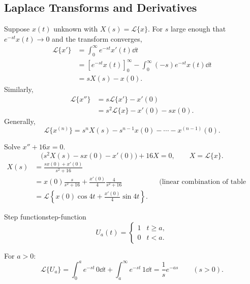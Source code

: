 \subsection{Laplace Transforms and Derivatives}

Suppose $x(t)$ unknown with $X(s)=\mathcal L\{x\}$. For $s$ large enough that $e^{-st}x(t)\to0$ and the transform converges,
\begin{align*}
  \mathcal L\{x'\} & =\int_0^\infty e^{-st}x'(t)\dd t                                     \\
                   & =\left[e^{-st}x(t)\right]_0^\infty-\int_0^\infty(-s)e^{-st}x(t)\dd t \\
                   & =sX(s)-x(0).
\end{align*}
Similarly,
\begin{align*}
  \mathcal L\{x''\} & =s\mathcal L\{x'\}-x'(0)         \\
                    & =s^2\mathcal L\{x\}-x'(0)-sx(0).
\end{align*}
Generally,
\[
  \mathcal L\{x^{(n)}\}=s^nX(s)-s^{n-1}x(0)-\cdots-x^{(n-1)}(0).
\]

\begin{example}
  Solve $x''+16x=0$.
  \[
    \bigl(s^2X(s)-sx(0)-x'(0)\bigr)+16X=0,\qquad X=\mathcal L\{x\}.
  \]
  \begin{align*}
    X(s) & =\frac{sx(0)+x'(0)}{s^2+16}                                                                              \\
         & =x(0)\frac{s}{s^2+16}+\frac{x'(0)}4\frac4{s^2+16}
         &                                                             & \text{(linear combination of table forms)} \\
         & =\mathcal L\left\{x(0)\cos 4t+\frac{x'(0)}4\sin 4t\right\}.
  \end{align*}
\end{example}

\begin{definition}{Step function}{step-function}
  \[
    U_a(t)=
    \begin{cases}
      1 & t\ge a, \\0&t<a.
    \end{cases}
  \]
  \begin{center}
  \end{center}
\end{definition}
For $a>0$:
\[
  \mathcal L\{U_a\}=\int_0^a e^{-st}\,0\dd t+\int_a^\infty e^{-st}\,1\dd t
  =\frac1s e^{-as}\qquad(s>0).
\]

